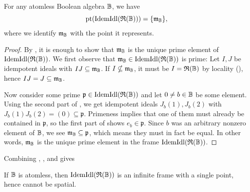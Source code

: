 \documentclass{amsart}
\begin{document}
    \begin{Prop}\label{prop:idempoints}
        For any atomless Boolean algebra $\mathbb{B}$, we have 
            \[
                \operatorname{pt}(\mathrm{IdemIdl}(\mathfrak{R}(\mathbb{B}))) = \{\mathfrak{m}_{\mathbb{B}}\},
            \]
        where we identify $\mathfrak{m}_{\mathbb{B}}$ with the point it represents.
    \end{Prop}
    \begin{proof}
        By , it is enough to show that $\mathfrak m_{\mathbb{B}}$ is the unique prime element of $\mathrm{IdemIdl}(\mathfrak{R}(\mathbb{B}))$. We first observe that $\mathfrak{m}_{\mathbb{B}} \in \mathrm{IdemIdl}(\mathfrak{R}(\mathbb{B}))$ is prime: Let $I,J$ be idempotent ideals with $IJ \subseteq \mathfrak{m}_{\mathbb{B}}$. If $I \nsubseteq \mathfrak{m}_{\mathbb{B}}$, it must be $I = \mathfrak{R}(\mathbb{B})$ by locality (), hence $IJ = J \subseteq \mathfrak{m}_{\mathbb{B}}$. 
    
        Now consider some prime $\mathfrak{p} \in \mathrm{IdemIdl}(\mathfrak{R}(\mathbb{B}))$ and let $0 \neq b \in \mathbb{B}$ be some element. Using the second part of , we get idempotent ideals $J_b(1),J_b(2)$ with $J_b(1)J_b(2) = (0) \subseteq \mathfrak{p}$. Primeness implies that one of them must already be contained in $\mathfrak{p}$, so the first part of  shows $e_b \in \mathfrak{p}$. Since $b$ was an arbitrary nonzero element of $\mathbb{B}$, we see $\mathfrak{m}_{\mathbb{B}} \subseteq \mathfrak{p}$, which means they must in fact be equal. In other words, $\mathfrak{m}_{\mathbb{B}}$ is the unique prime element in the frame $\mathrm{IdemIdl}(\mathfrak{R}(\mathbb{B}))$.
    \end{proof}
    
    Combining , , and  gives
    
    \begin{Cor}\label{cor:idemnonspatial}
        If $\mathbb{B}$ is atomless, then $\mathrm{IdemIdl}(\mathfrak{R}(\mathbb{B}))$ is an infinite frame with a single point, hence cannot be spatial.
    \end{Cor}
    
\end{document}
